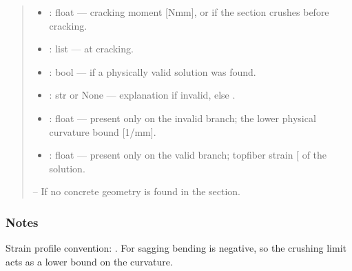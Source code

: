 \documentclass[a4paper,11pt,german]{sphinxmanual}
\begin{document}
\begin{fulllineitems}
\begin{quote}
\begin{description}
\begin{itemize}
\item {} 
\sphinxAtStartPar
{} : float — cracking moment {[}Nmm{]}, or 
if the section crushes before cracking.

\item {} 
\sphinxAtStartPar
{} : list —  at cracking.

\item {} 
\sphinxAtStartPar
{} : bool —  if a physically valid solution was found.

\item {} 
\sphinxAtStartPar
{} : str or None — explanation if invalid, else .

\item {} 
\sphinxAtStartPar
{} : float — present only on the invalid branch;
the lower physical curvature bound {[}1/mm{]}.

\item {} 
\sphinxAtStartPar
{} : float — present only on the valid branch; top\sphinxhyphen{}fiber
strain {[}\sphinxhyphen{}{]} of the solution.

\end{itemize}


\sphinxAtStartPar
{}

\sphinxAtStartPar
{} – If no concrete geometry is found in the section.

\end{description}\end{quote}
\subsubsection*{Notes}

\sphinxAtStartPar
Strain profile convention: . For sagging
bending  is negative, so the crushing limit acts as a lower
bound on the curvature.

\end{fulllineitems}
\end{document}
